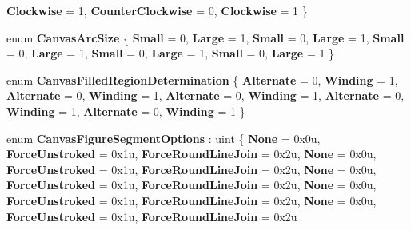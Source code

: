 \begin{DoxyCompactItemize}
{\bfseries Clockwise} = 1, 
\newline
{\bfseries Counter\+Clockwise} = 0, 
{\bfseries Clockwise} = 1
 \}
\item 
\mbox{\label{namespace_microsoft_1_1_graphics_1_1_canvas_1_1_geometry_a583cc3265f037d53e69808d04a785d9a}} 
enum {\bfseries Canvas\+Arc\+Size} \{ \newline
{\bfseries Small} = 0, 
{\bfseries Large} = 1, 
{\bfseries Small} = 0, 
{\bfseries Large} = 1, 
\newline
{\bfseries Small} = 0, 
{\bfseries Large} = 1, 
{\bfseries Small} = 0, 
{\bfseries Large} = 1, 
\newline
{\bfseries Small} = 0, 
{\bfseries Large} = 1
 \}
\item 
\mbox{\label{namespace_microsoft_1_1_graphics_1_1_canvas_1_1_geometry_af9fb7e1db5b8bf2c9334f51491270043}} 
enum {\bfseries Canvas\+Filled\+Region\+Determination} \{ \newline
{\bfseries Alternate} = 0, 
{\bfseries Winding} = 1, 
{\bfseries Alternate} = 0, 
{\bfseries Winding} = 1, 
\newline
{\bfseries Alternate} = 0, 
{\bfseries Winding} = 1, 
{\bfseries Alternate} = 0, 
{\bfseries Winding} = 1, 
\newline
{\bfseries Alternate} = 0, 
{\bfseries Winding} = 1
 \}
\item 
\mbox{\label{namespace_microsoft_1_1_graphics_1_1_canvas_1_1_geometry_ada89e04bb167c7a96061368c1d6cc2ab}} 
enum {\bfseries Canvas\+Figure\+Segment\+Options} \+: uint \{ \newline
{\bfseries None} = 0x0u, 
{\bfseries Force\+Unstroked} = 0x1u, 
{\bfseries Force\+Round\+Line\+Join} = 0x2u, 
{\bfseries None} = 0x0u, 
\newline
{\bfseries Force\+Unstroked} = 0x1u, 
{\bfseries Force\+Round\+Line\+Join} = 0x2u, 
{\bfseries None} = 0x0u, 
{\bfseries Force\+Unstroked} = 0x1u, 
\newline
{\bfseries Force\+Round\+Line\+Join} = 0x2u, 
{\bfseries None} = 0x0u, 
{\bfseries Force\+Unstroked} = 0x1u, 
{\bfseries Force\+Round\+Line\+Join} = 0x2u, 
\newline
{\bfseries None} = 0x0u, 
{\bfseries Force\+Unstroked} = 0x1u, 
{\bfseries Force\+Round\+Line\+Join} = 0x2u

\end{DoxyCompactItemize}
